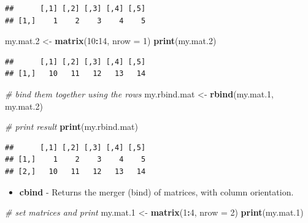 \documentclass[11pt,]{book}
\newenvironment{Shaded}{\begin{snugshade}}{\end{snugshade}}
\newcommand{\KeywordTok}[1]{\textcolor[rgb]{0.27,0.27,0.27}{\textbf{#1}}}
\newcommand{\DataTypeTok}[1]{\textcolor[rgb]{0.27,0.27,0.27}{#1}}
\newcommand{\DecValTok}[1]{\textcolor[rgb]{0.06,0.06,0.06}{#1}}
\newcommand{\StringTok}[1]{\textcolor[rgb]{0.5,0.5,0.5}{#1}}
\newcommand{\CommentTok}[1]{\textcolor[rgb]{0.56,0.35,0.01}{\textit{#1}}}
\newcommand{\OperatorTok}[1]{\textcolor[rgb]{0.81,0.36,0.00}{\textbf{#1}}}
\newcommand{\NormalTok}[1]{#1}
\providecommand{\tightlist}{%
  \setlength{\itemsep}{0pt}\setlength{\parskip}{0pt}}
\begin{document}
\begin{verbatim}
##      [,1] [,2] [,3] [,4] [,5]
## [1,]    1    2    3    4    5
\end{verbatim}

\begin{Shaded}
\begin{Highlighting}[]
\NormalTok{my.mat.}\DecValTok{2}\NormalTok{ <-}\StringTok{ }\KeywordTok{matrix}\NormalTok{(}\DecValTok{10}\OperatorTok{:}\DecValTok{14}\NormalTok{, }\DataTypeTok{nrow =} \DecValTok{1}\NormalTok{)}
\KeywordTok{print}\NormalTok{(my.mat.}\DecValTok{2}\NormalTok{)}
\end{Highlighting}
\end{Shaded}

\begin{verbatim}
##      [,1] [,2] [,3] [,4] [,5]
## [1,]   10   11   12   13   14
\end{verbatim}

\begin{Shaded}
\begin{Highlighting}[]
\CommentTok{# bind them together using the rows}
\NormalTok{my.rbind.mat <-}\StringTok{ }\KeywordTok{rbind}\NormalTok{(my.mat.}\DecValTok{1}\NormalTok{, my.mat.}\DecValTok{2}\NormalTok{)}

\CommentTok{# print result}
\KeywordTok{print}\NormalTok{(my.rbind.mat)}
\end{Highlighting}
\end{Shaded}

\begin{verbatim}
##      [,1] [,2] [,3] [,4] [,5]
## [1,]    1    2    3    4    5
## [2,]   10   11   12   13   14
\end{verbatim}

\begin{itemize}
\tightlist
\item
  \textbf{cbind} - Returns the merger (bind) of matrices, with column
  orientation. 
\end{itemize}

\begin{Shaded}
\begin{Highlighting}[]
\CommentTok{# set matrices and print}
\NormalTok{my.mat.}\DecValTok{1}\NormalTok{ <-}\StringTok{ }\KeywordTok{matrix}\NormalTok{(}\DecValTok{1}\OperatorTok{:}\DecValTok{4}\NormalTok{, }\DataTypeTok{nrow =} \DecValTok{2}\NormalTok{)}
\KeywordTok{print}\NormalTok{(my.mat.}\DecValTok{1}\NormalTok{)}
\end{Highlighting}
\end{Shaded}
\end{document}
